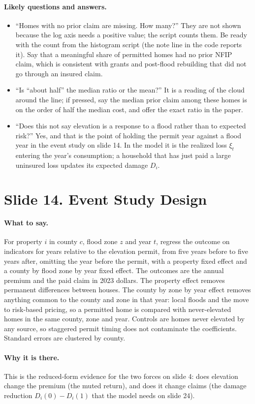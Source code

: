 \documentclass[11pt]{article}
\newcommand{\slide}[2]{\section*{Slide #1. #2}\addcontentsline{toc}{section}{Slide #1. #2}}
\newcommand{\say}{\paragraph{What to say.}}
\newcommand{\why}{\paragraph{Why it is there.}}
\newcommand{\qa}{\paragraph{Likely questions and answers.}}
\begin{document}
\qa
\begin{itemize}
\item ``Homes with no prior claim are missing. How many?'' They are not shown because the log axis needs a positive value; the script counts them. Be ready with the count from the histogram script (the note line in the code reports it). Say that a meaningful share of permitted homes had no prior NFIP claim, which is consistent with grants and post-flood rebuilding that did not go through an insured claim.
\item ``Is ``about half'' the median ratio or the mean?'' It is a reading of the cloud around the line; if pressed, say the median prior claim among these homes is on the order of half the median cost, and offer the exact ratio in the paper.
\item ``Does this not say elevation is a response to a flood rather than to expected risk?'' Yes, and that is the point of holding the permit year against a flood year in the event study on slide 14. In the model it is the realized loss $\xi_t$ entering the year's consumption; a household that has just paid a large uninsured loss updates its expected damage $D_i$.
\end{itemize}

\slide{14}{Event Study Design}
\say For property $i$ in county $c$, flood zone $z$ and year $t$, regress the outcome on indicators for years relative to the elevation permit, from five years before to five years after, omitting the year before the permit, with a property fixed effect and a county by flood zone by year fixed effect. The outcomes are the annual premium and the paid claim in 2023 dollars. The property effect removes permanent differences between houses. The county by zone by year effect removes anything common to the county and zone in that year: local floods and the move to risk-based pricing, so a permitted home is compared with never-elevated homes in the same county, zone and year. Controls are homes never elevated by any source, so staggered permit timing does not contaminate the coefficients. Standard errors are clustered by county.

\why This is the reduced-form evidence for the two forces on slide 4: does elevation change the premium (the muted return), and does it change claims (the damage reduction $D_i(0)-D_i(1)$ that the model needs on slide 24).
\end{document}
